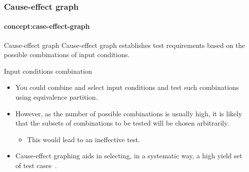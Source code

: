 \begin{frame}[parent={concept:functional-testing}, hasprev=false, hasnext=true]
\frametitle{Cause-effect graph}
\framesubtitle{concept:case-effect-graph}

\begin{block:concept}{Cause-effect graph}
Cause-effect graph establishes test requirements based on the possible
combinations of input conditions.
\end{block:concept}


\begin{block:fact}{Input conditions combination}
\begin{itemize}
	\item You could combine and select input conditions and test such
	combinations using equivalence partition.

	\item However, as the number of possible combinations is usually high,
	it is likely that the subsets of combinations to be tested will be chosen
	arbitrarily.
	\begin{itemize}
		\item This would lead to an ineffective test.
	\end{itemize}

	\item Cause-effect graphing aids in selecting, in a systematic way,
	a high yield set of test cases~\cite[p. 66]{myers:2004}.
\end{itemize}
\end{block:fact}
\end{frame}


